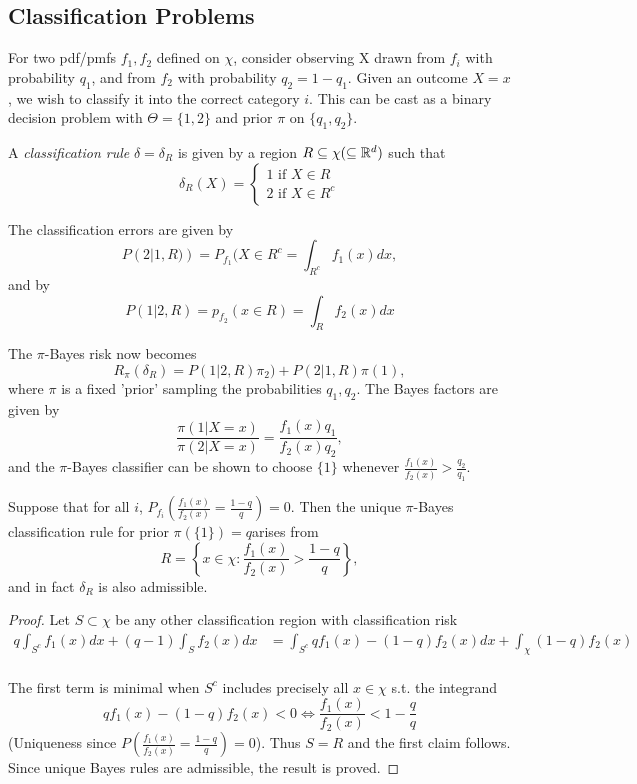 \documentclass[a4paper]{article}
\begin{document}
\subsection{Classification Problems}

For two pdf/pmfs $f_1, f_2$ defined on $\chi$, consider observing X drawn from $f_i$ with probability $q_1$, and from $f_2$ with probability $q_2 = 1-q_1$. Given an outcome $X=x$, we wish to classify it into the correct category $i$. This can be cast as a binary decision problem with $\Theta = \{1,2\} $ and prior  $\pi$ on $\{q_1, q_2\} $.

A \textit{classification rule} $\delta = \delta_{R}$ is given by a region $R\subseteq \chi (\subseteq \mathbb{R}^{d})$ such that
	\[
		\delta_R(X) = \begin{cases}
			1 \text{ if } X\in R \\
			2 \text{ if } X \in R^{c}
		\end{cases} 
	\]

	The classification errors are given by 
\[
	P\left( 2| 1, R) \right) = P_{f_1}(X\in R^{c} = \int_{R^{c}} f_1(x) dx
,\] and by
\[
	P\left( 1|2, R \right) = p_{f_2}(x\in R) = \int_{R} f_2(x) dx
\] 

The $\pi$-Bayes risk now becomes
\[
	R_{\pi}(\delta_{R}) = P\left(1|2, R \right) \pi_2) + P\left( 2|1,R \right) \pi(1)
,\] where $\pi$ is a fixed 'prior' sampling the probabilities $q_1, q_2$. The Bayes factors are given by
\[
	\frac{\pi(1|X=x)}{\pi(2|X=x)} = \frac{f_1(x) q_1}{f_2(x)q_2}
,\] and the $\pi$-Bayes classifier can be shown to choose $\{1\} $ whenever $\frac{f_1(x)}{f_2(x)} > \frac{q_2}{q_1}$. 

\begin{prop}
	Suppose that for all $i$, $P_{f_i} \left( \frac{f_1(x)}{f_2(x)} = \frac{1-q}{q} \right) = 0$. Then the unique $\pi$-Bayes classification rule for prior $\pi(\{1\})=q$arises from
	\[
		R = \left\{x\in \chi : \frac{f_1(x)}{f_2(x)} > \frac{1-q}{q}\right\} 
	,\]
	and in fact $\delta_R$ is also admissible.
\end{prop}

\begin{proof}
	Let $S \subset \chi$ be any other classification region with classification risk
	\begin{align*}
		q \int_{S^{c}} f_1(x) dx + (q-1) \int_{S}f_2(x) dx &= \int_{S^{c}} qf_1(x) - (1-q)f_2(x) dx + \int_{\chi} (1-q)f_2(x) \\
	\end{align*}

	The first term is minimal when $S^{c}$ includes precisely all $x \in \chi$ s.t. the integrand
	\[ 
		qf_1(x) - (1-q)f_2(x) < 0 \iff \frac{f_1(x)}{f_2(x)} < 1-\frac{q}{q}
	\]
	(Uniqueness since $P\left( \frac{f_1(x)}{f_2(x)} = \frac{1-q}{q} \right) = 0$). Thus $S = R$ and the first claim follows. Since unique Bayes rules are admissible, the result is proved. 
\end{proof}
\end{document}
